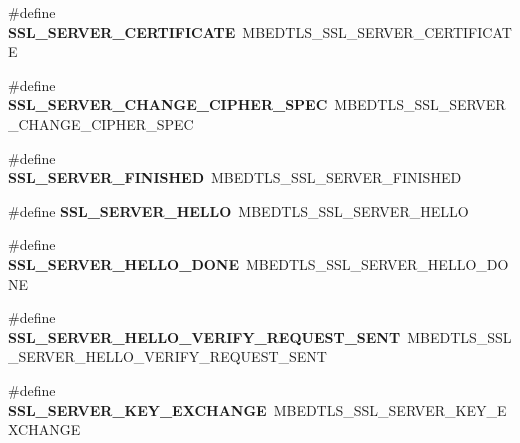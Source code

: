 \begin{DoxyCompactItemize}
\item 
\mbox{\label{compat-1_83_8h_aa97838e8945f2d6615c6e0f5d04be715}} 
\#define {\bfseries S\+S\+L\+\_\+\+S\+E\+R\+V\+E\+R\+\_\+\+C\+E\+R\+T\+I\+F\+I\+C\+A\+TE}~M\+B\+E\+D\+T\+L\+S\+\_\+\+S\+S\+L\+\_\+\+S\+E\+R\+V\+E\+R\+\_\+\+C\+E\+R\+T\+I\+F\+I\+C\+A\+TE
\item 
\mbox{\label{compat-1_83_8h_a0ca383e705aaa545175827ba1cb5281d}} 
\#define {\bfseries S\+S\+L\+\_\+\+S\+E\+R\+V\+E\+R\+\_\+\+C\+H\+A\+N\+G\+E\+\_\+\+C\+I\+P\+H\+E\+R\+\_\+\+S\+P\+EC}~M\+B\+E\+D\+T\+L\+S\+\_\+\+S\+S\+L\+\_\+\+S\+E\+R\+V\+E\+R\+\_\+\+C\+H\+A\+N\+G\+E\+\_\+\+C\+I\+P\+H\+E\+R\+\_\+\+S\+P\+EC
\item 
\mbox{\label{compat-1_83_8h_a76a3567e1a6086c4dda7481267302af1}} 
\#define {\bfseries S\+S\+L\+\_\+\+S\+E\+R\+V\+E\+R\+\_\+\+F\+I\+N\+I\+S\+H\+ED}~M\+B\+E\+D\+T\+L\+S\+\_\+\+S\+S\+L\+\_\+\+S\+E\+R\+V\+E\+R\+\_\+\+F\+I\+N\+I\+S\+H\+ED
\item 
\mbox{\label{compat-1_83_8h_a0d66067badb079c2737f4bba33abeec3}} 
\#define {\bfseries S\+S\+L\+\_\+\+S\+E\+R\+V\+E\+R\+\_\+\+H\+E\+L\+LO}~M\+B\+E\+D\+T\+L\+S\+\_\+\+S\+S\+L\+\_\+\+S\+E\+R\+V\+E\+R\+\_\+\+H\+E\+L\+LO
\item 
\mbox{\label{compat-1_83_8h_a8aca26e17333dba32450c31f7d9fdd85}} 
\#define {\bfseries S\+S\+L\+\_\+\+S\+E\+R\+V\+E\+R\+\_\+\+H\+E\+L\+L\+O\+\_\+\+D\+O\+NE}~M\+B\+E\+D\+T\+L\+S\+\_\+\+S\+S\+L\+\_\+\+S\+E\+R\+V\+E\+R\+\_\+\+H\+E\+L\+L\+O\+\_\+\+D\+O\+NE
\item 
\mbox{\label{compat-1_83_8h_ae00aeb039843031549ebef1501e8a00e}} 
\#define {\bfseries S\+S\+L\+\_\+\+S\+E\+R\+V\+E\+R\+\_\+\+H\+E\+L\+L\+O\+\_\+\+V\+E\+R\+I\+F\+Y\+\_\+\+R\+E\+Q\+U\+E\+S\+T\+\_\+\+S\+E\+NT}~M\+B\+E\+D\+T\+L\+S\+\_\+\+S\+S\+L\+\_\+\+S\+E\+R\+V\+E\+R\+\_\+\+H\+E\+L\+L\+O\+\_\+\+V\+E\+R\+I\+F\+Y\+\_\+\+R\+E\+Q\+U\+E\+S\+T\+\_\+\+S\+E\+NT
\item 
\mbox{\label{compat-1_83_8h_a0e7a398034bb1b60fd957ce9ec6e940f}} 
\#define {\bfseries S\+S\+L\+\_\+\+S\+E\+R\+V\+E\+R\+\_\+\+K\+E\+Y\+\_\+\+E\+X\+C\+H\+A\+N\+GE}~M\+B\+E\+D\+T\+L\+S\+\_\+\+S\+S\+L\+\_\+\+S\+E\+R\+V\+E\+R\+\_\+\+K\+E\+Y\+\_\+\+E\+X\+C\+H\+A\+N\+GE

\end{DoxyCompactItemize}
